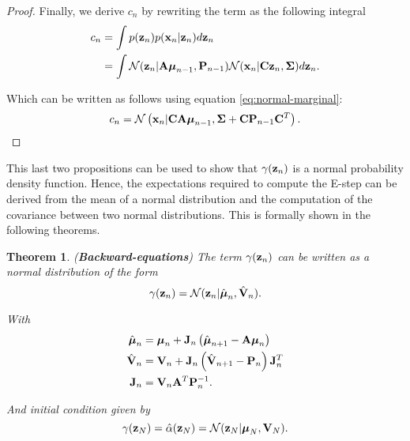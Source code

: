 \documentclass[11pt]{article}
\numberwithin{equation}{section}
\newcommand{\x}{{\bf x}}
\newcommand{\z}{{\bf z}}
\newcommand{\N}{\mathcal{N}}
\newtheorem{theorem}{Theorem}[section]
\begin{document}
\begin{proof}
	Finally, we derive $c_n$ by rewriting the term as the following integral
	\begin{align}
		c_n &= \int p(\z_n) p (\x_n \vert \z_n) d\z_n\\
			&= \int \N(\z_n\vert {\bf A} \boldsymbol\mu_{n-1}, {\bf P}_{n-1}) \N(\x_n \vert {\bf C}\z_n, \boldsymbol\Sigma) d\z_n.
	\end{align}
	
	Which can be written as follows using equation \eqref{eq:normal-marginal}:
	\begin{equation}
		c_n = \N\left(\x_n \vert {\bf C}{\bf A}\boldsymbol\mu_{n-1}, \boldsymbol\Sigma + {\bf C}{\bf P}_{n-1}{\bf C}^T\right).
	\end{equation}	
\end{proof}


This last two propositions can be used to show that $\gamma(\z_n)$ is a normal probability density function. Hence, the expectations required to compute the E-step can be derived from the mean of a normal distribution and the computation of the covariance between two normal distributions. This is formally shown in the following theorems.


\begin{theorem} (\textbf{Backward-equations}) \label{theorem:beta-backward-equations}
	The term $\gamma(\z_n)$ can be written as a normal distribution of the form
	\begin{equation}
		\gamma(\z_n) = \N(\z_n\vert \hat{\boldsymbol\mu}_n, \hat{\bf V}_n).
	\end{equation}
	
	With
	\begin{align}
		\hat{\boldsymbol{\mu}}_n &= \boldsymbol{\mu}_n + {\bf J}_n\left(\hat{\boldsymbol \mu}_{n+1} - {\bf A}\boldsymbol\mu_n\right)\\
		\hat{\bf V}_n &= {\bf V}_n + {\bf J}_n\left(\hat{\bf V}_{n+1} - {\bf P}_n\right){\bf J}_n^T\\
		{\bf J}_n &= {\bf V}_n{\bf A}^T{\bf P}_n^{-1}.
	\end{align}
	
	And initial condition given by
	\begin{equation}
		\gamma(\z_N) = \hat\alpha(\z_N) = \N(\z_N\vert \boldsymbol\mu_N, {\bf V}_N).
	\end{equation}
\end{theorem}
\end{document}

